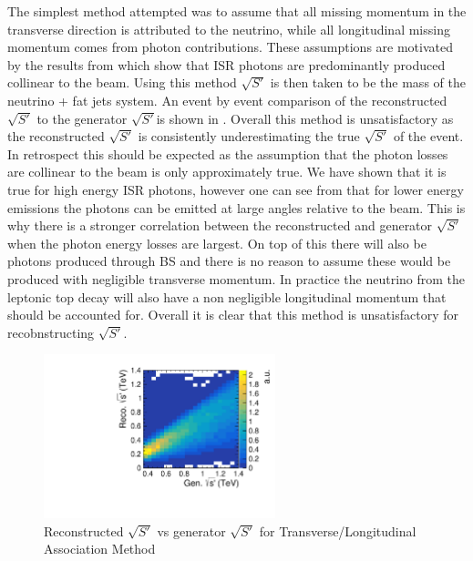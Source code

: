 The simplest method attempted was to assume that all missing momentum in the transverse direction is attributed to the neutrino, while all longitudinal missing momentum comes from photon contributions. These assumptions are motivated by the results from  which show that \ac{ISR} photons are predominantly produced collinear to the beam. Using this method $\sqrt{S'}$ is then taken to be the mass of the neutrino + fat jets system. An event by event comparison of the reconstructed $\sqrt{S'}$ to the generator $\sqrt{S'}$is shown in . Overall this method is unsatisfactory as the reconstructed $\sqrt{S'}$ is consistently underestimating the true $\sqrt{S'}$ of the event. In retrospect this should be expected as the assumption that the photon losses are collinear to the beam is only approximately true. We have shown that it is true for high energy \ac{ISR} photons, however one can see from  that for lower energy emissions the photons can be emitted at large angles relative to the beam. This is why there is a stronger correlation between the reconstructed and generator $\sqrt{S'}$ when the photon energy losses are largest. On top of this there will also be photons produced through \ac{BS} and there is no reason to assume these would be produced with negligible transverse momentum. In practice the neutrino from the leptonic top decay will also have a non negligible longitudinal momentum that should be accounted for. Overall it is clear that this method is unsatisfactory for recobnstructing $\sqrt{S'}$.

\begin{figure}
  \centering
  \includegraphics[width=0.6\textwidth]{TopAnalysis/figures/CrudeEVsTrueE.pdf}
  \caption[Reconstructed $\sqrt{S'}$ vs generator $\sqrt{S'}$ for Transverse/Longitudinal Association Method]{Reconstructed $\sqrt{S'}$ vs generator $\sqrt{S'}$ for Transverse/Longitudinal Association Method}
  \label{fig:simpleAssoication}
\end{figure}

